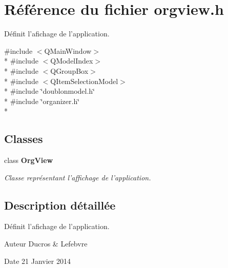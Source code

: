 \section{Référence du fichier orgview.\-h}
\label{orgview_8h}


Définit l'afichage de l'application.  


{\ttfamily \#include $<$Q\-Main\-Window$>$}\\*
{\ttfamily \#include $<$Q\-Model\-Index$>$}\\*
{\ttfamily \#include $<$Q\-Group\-Box$>$}\\*
{\ttfamily \#include $<$Q\-Item\-Selection\-Model$>$}\\*
{\ttfamily \#include \char`\"{}doublonmodel.\-h\char`\"{}}\\*
{\ttfamily \#include \char`\"{}organizer.\-h\char`\"{}}\\*
\subsection*{Classes}
\begin{DoxyCompactItemize}
\item 
class {\bf Org\-View}
\begin{DoxyCompactList}\small\item\em Classe représentant l'affichage de l'application. \end{DoxyCompactList}\end{DoxyCompactItemize}


\subsection{Description détaillée}
Définit l'afichage de l'application. \begin{DoxyAuthor}{Auteur}
Ducros \& Lefebvre 
\end{DoxyAuthor}
\begin{DoxyDate}{Date}
21 Janvier 2014 
\end{DoxyDate}
